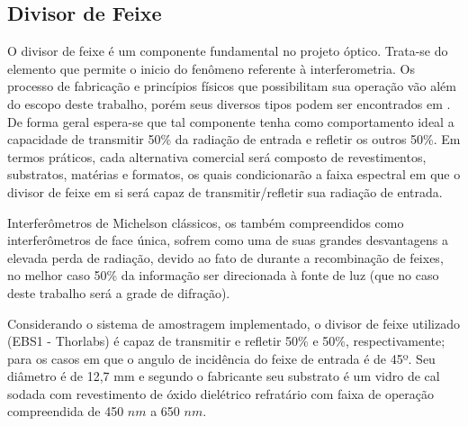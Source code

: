 \documentclass[oneside,openright,12pt]{ufsm_2021} %
\begin{document}
        \subsection{Divisor de Feixe}
            \par O divisor de feixe é um componente fundamental no projeto óptico. Trata-se do elemento que permite o inicio do fenômeno referente à interferometria. Os processo de fabricação e princípios físicos que possibilitam sua operação vão além do escopo deste trabalho, porém seus diversos tipos podem ser encontrados em \cite{Bell:MIT}. De forma geral espera-se que tal componente tenha como comportamento ideal a capacidade de transmitir 50\% da radiação de entrada e refletir os outros 50\%.
            Em termos práticos, cada alternativa comercial será composto de revestimentos, substratos, matérias e formatos, os quais condicionarão a faixa espectral em que o divisor de feixe em si será capaz de transmitir/refletir sua radiação de entrada.
            \par Interferômetros de Michelson clássicos, os também compreendidos como interferômetros de face única, sofrem como uma de suas grandes desvantagens \cite{MIT} a elevada perda de radiação, devido ao fato de durante a recombinação de feixes, no melhor caso 50\% da informação ser direcionada à fonte de luz (que no caso deste trabalho será a grade de difração).
            \par Considerando o sistema de amostragem implementado, o divisor de feixe utilizado (EBS1 - Thorlabs) é capaz de transmitir e refletir 50\% e 50\%, respectivamente; para os casos em que o angulo de incidência do feixe de entrada é de 45º. Seu diâmetro é de 12,7 mm e segundo o fabricante seu substrato é um vidro de cal sodada com revestimento de óxido dielétrico refratário com faixa de operação compreendida de 450 $nm$ a 650 $nm$.
            
\end{document}
